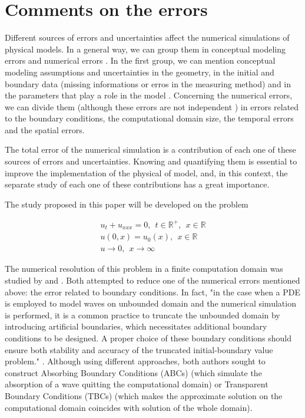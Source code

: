 \section{Comments on the errors}
\label{sec:errors}

\indent Different sources of errors and uncertainties affect the numerical simulations of physical models. In a general way, we can group them in conceptual modeling errors and numerical errors \cite{roache1997}. In the first group, we can mention conceptual modeling assumptions and uncertainties in the geometry, in the initial and boundary data (missing informations or erros in the measuring method) and in the parameters that play a role in the model \cite{roache1997,balagurusamy2008}. Concerning the numerical errors, we can divide them \cite{karniadakis1995} (although these errors are not independent \cite{roache1997}) in errors related to the boundary conditions, the computational domain size, the temporal errors and the spatial errors.

\indent The total error of the numerical simulation is a contribution of each one of these sources of errors and uncertainties. Knowing and quantifying them is essential to improve the implementation of the physical of model, and, in this context, the separate study of each one of these contributions has a great importance.

\indent The study proposed in this paper will be developed on the problem

\begin{equation}
 \label{eq:problemDKdV}
\begin{gathered}
	u_t + u_{xxx} = 0, \ \ t \in \mathbb{R}^+, \ \ x \in \mathbb{R} \\
	u(0,x) = u_0(x), \ \ x \in \mathbb{R} \\
	u \longrightarrow 0, \ \ x \longrightarrow \infty
\end{gathered}
\end{equation}

\indent The numerical resolution of this problem in a finite computation domain was studied by \cite{zheng2008} and \cite{besse2015}. Both attempted to reduce one of the numerical errors mentioned above: the error related to boundary conditions. In fact, "in the case when a PDE is employed to model waves on unbounded domain and the numerical simulation is performed, it is a common practice to truncate the unbounded domain by introducing artificial boundaries, which necessitates additional boundary conditions to be designed. A proper choice of these boundary conditions should ensure both stability and accuracy of the truncated initial-boundary value problem." \cite{zheng2008}. Although using different approaches, both authors sought to construct Absorbing Boundary Conditions (ABCs) (which simulate the absorption of a wave quitting the computational domain) or Transparent Boundary Conditions (TBCs) (which makes the approximate solution on the computational domain coincides with solution of the whole domain).

